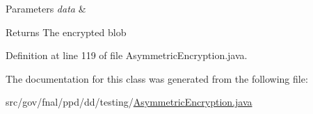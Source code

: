 \begin{DoxyParams}{Parameters}
{\em data} & \\
\hline
\end{DoxyParams}
\begin{DoxyReturn}{Returns}
The encrypted blob 
\end{DoxyReturn}


Definition at line 119 of file Asymmetric\-Encryption.\-java.



The documentation for this class was generated from the following file\-:\begin{DoxyCompactItemize}
\item 
src/gov/fnal/ppd/dd/testing/\hyperlink{AsymmetricEncryption_8java}{Asymmetric\-Encryption.\-java}\end{DoxyCompactItemize}
